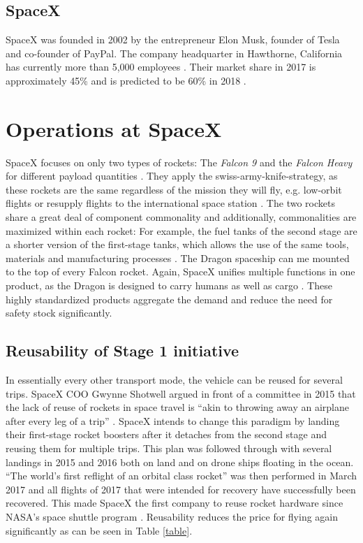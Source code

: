 \documentclass[11pt,a4paper]{article}
\begin{document}
\subsection{SpaceX}
SpaceX was founded in 2002 by the entrepreneur Elon Musk, founder of Tesla and co-founder of PayPal. The company headquarter in Hawthorne, California has currently more than 5,000 employees \cite{scs76}. Their market share in 2017 is approximately 45\% and is predicted to be 60\% in 2018 \cite{scs64}.
\section{Operations at SpaceX}\label{operations-at-spacex}
SpaceX focuses on only two types of rockets: The \emph{Falcon 9} and the \emph{Falcon Heavy} for different payload quantities \cite{scs20}. They apply the swiss-army-knife-strategy, as these rockets are the same regardless of the mission they will fly, e.g. low-orbit flights or resupply flights to the international space station \cite{scs33}. The two rockets share a great deal of component commonality and additionally, commonalities are maximized within each rocket:  For example, the fuel tanks of the second stage are a shorter version of the first-stage tanks, which allows the use of the same tools, materials and manufacturing processes \cite{scs33}.
The Dragon spaceship can me mounted to the top of every Falcon rocket. Again, SpaceX unifies multiple functions in one product, as the Dragon is designed to carry humans as well as cargo \cite{scs19}.
These highly standardized products aggregate the demand and reduce the need for safety stock significantly.
\subsection{ Reusability of Stage 1 initiative}\label{reusability-of-stage-1-initiative}

In essentially every other transport mode, the vehicle can be reused for several trips. SpaceX COO Gwynne Shotwell argued in front of a committee in 2015 that the lack of reuse of rockets in space travel is “akin to throwing away an airplane after every leg of a trip” \cite{scs21}. SpaceX intends to change this paradigm by landing their first-stage rocket boosters after it detaches from the second stage and reusing them for multiple trips.
This plan was followed through with several landings in 2015 and 2016 both on land and on drone ships floating in the ocean. “The world’s first reflight of an orbital class rocket” was then performed in March 2017 \cite{scs34} and all flights of 2017 that were intended for recovery have successfully been recovered. This made SpaceX the first company to reuse rocket hardware since NASA’s space shuttle program \cite{scs15}.
Reusability reduces the price for flying again significantly as can be seen in Table \ref{table}.
\end{document}
